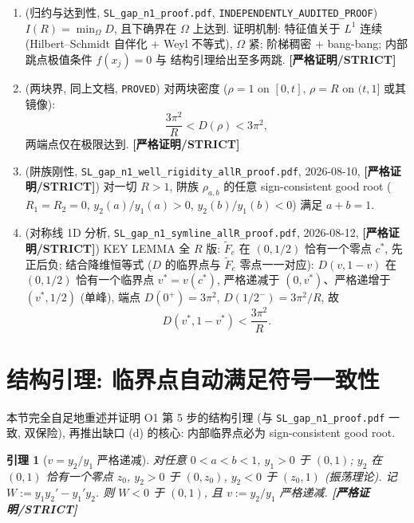 \documentclass[UTF8]{ctexart}
\newtheorem{lemma}[theorem]{引理}
\newcommand{\STRICT}{\textbf{[严格证明/STRICT]}}
\begin{document}
\begin{enumerate}
	\item[\textbf{(O1-INF)}] (归约与达到性, \texttt{SL\_gap\_n1\_proof.pdf},
		\texttt{INDEPENDENTLY\_AUDITED\_PROOF})
		$I(R)=\min_{\Omega}D$, 且下确界在 $\Omega$ 上达到.
		证明机制: 特征值关于 $L^1$ 连续 (Hilbert--Schmidt 自伴化 + Weyl 不等式),
		$\Omega$ 紧; 阶梯稠密 + bang-bang; 内部跳点极值条件 $f(x_j)=0$ 与
		结构引理给出至多两跳. \STRICT{}
	\item[\textbf{(O3b)}] (两块界, 同上文档, \texttt{PROVED})
		对两块密度 ($\rho=1$ on $[0,t]$, $\rho=R$ on $(t,1]$ 或其镜像):
		\begin{equation}
			\frac{3\pi^2}{R}<D(\rho)<3\pi^2,
		\end{equation}
		两端点仅在极限达到. \STRICT{}
	\item[\textbf{(b)}] (阱族刚性, \texttt{SL\_gap\_n1\_well\_rigidity\_allR\_proof.pdf},
		2026-08-10, \STRICT)
		对一切 $R>1$, 阱族 $\rho_{a,b}$ 的任意 sign-consistent good root
		($R_1=R_2=0$, $y_2(a)/y_1(a)>0$, $y_2(b)/y_1(b)<0$) 满足 $a+b=1$.
	\item[\textbf{(a$'$)}] (对称线 1D 分析, \texttt{SL\_gap\_n1\_symline\_allR\_proof.pdf},
		2026-08-12, \STRICT)
		KEY LEMMA 全 $R$ 版: $\widetilde F_e$ 在 $(0,1/2)$ 恰有一个零点 $c^*$,
		先正后负; 结合降维恒等式 ($D$ 的临界点与 $\widetilde F_e$ 零点一一对应):
		$D(v,1-v)$ 在 $(0,1/2)$ 恰有一个临界点 $v^*=v(c^*)$, 严格递减于
		$(0,v^*)$、严格递增于 $(v^*,1/2)$ (单峰), 端点
		$D(0^+)=3\pi^2$, $D(1/2^-)=3\pi^2/R$, 故
		\begin{equation}
			D(v^*,1-v^*)<\frac{3\pi^2}{R}.
			\label{eq:Dvstar}
		\end{equation}
\end{enumerate}

\section{结构引理: 临界点自动满足符号一致性}\label{sec:goodroot}

本节完全自足地重述并证明 O1 第 5 步的结构引理 (与 \texttt{SL\_gap\_n1\_proof.pdf}
一致, 双保险), 再推出缺口 (d) 的核心: 内部临界点必为 sign-consistent good root.

\begin{lemma}[$v=y_2/y_1$ 严格递减]\label{lem:mono}
对任意 $0<a<b<1$, $y_1>0$ 于 $(0,1)$; $y_2$ 在 $(0,1)$ 恰有一个零点 $z_0$,
$y_2>0$ 于 $(0,z_0)$, $y_2<0$ 于 $(z_0,1)$ (振荡理论). 记
$W:=y_1y_2'-y_1'y_2$. 则 $W<0$ 于 $(0,1)$, 且 $v:=y_2/y_1$ 严格递减. \STRICT{}
\end{lemma}
\end{document}
